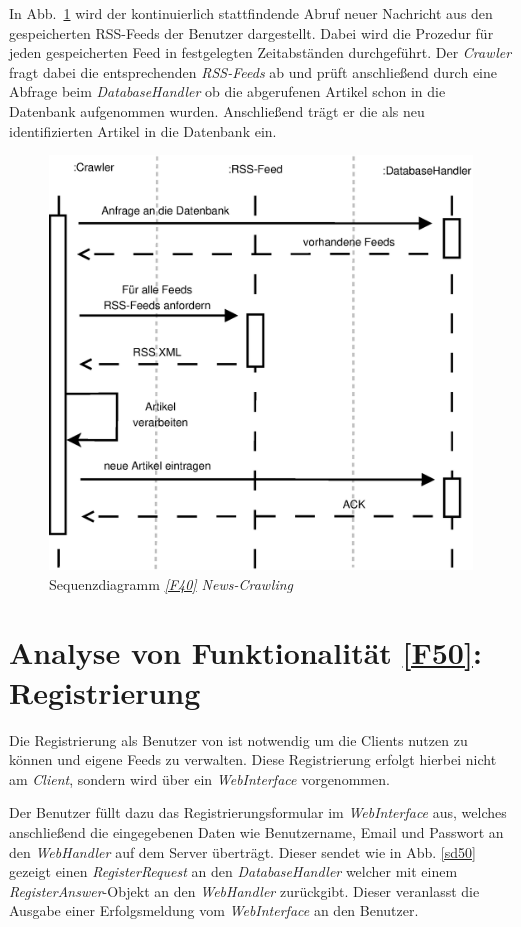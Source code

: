 In Abb.~\ref{sd40} wird der kontinuierlich stattfindende Abruf neuer Nachricht
aus den gespeicherten RSS-Feeds der Benutzer dargestellt. Dabei wird die
Prozedur für jeden gespeicherten Feed in festgelegten Zeitabständen
durchgeführt. Der \textit{Crawler} fragt dabei die entsprechenden
\textit{RSS-Feeds} ab und prüft anschließend durch eine Abfrage beim
\textit{DatabaseHandler} ob die abgerufenen Artikel schon in die Datenbank
aufgenommen wurden. Anschließend trägt er die als neu identifizierten Artikel in
die Datenbank ein.

\begin{figure}[h]
\centering
\includegraphics[width=.7\textwidth]{Systementwurf/02_produktfunktionsanalyse/f400}
\caption{Sequenzdiagramm \textit{\ref{F40} News-Crawling}
\label{sd40}}
\end{figure}

\FloatBarrier

\section{Analyse von Funktionalität \ref{F50}: Registrierung}

Die Registrierung als Benutzer von \NewsGenie ist notwendig um die Clients
nutzen zu können und eigene Feeds zu verwalten. Diese Registrierung erfolgt
hierbei nicht am \textit{Client}, sondern wird über ein \textit{WebInterface}
vorgenommen.

Der Benutzer füllt dazu das Registrierungsformular im \textit{WebInterface} aus,
welches anschließend die eingegebenen Daten wie Benutzername, Email und Passwort
an den \textit{WebHandler} auf dem Server überträgt. Dieser sendet wie in Abb.
\ref{sd50} gezeigt einen \textit{RegisterRequest} an den
\textit{DatabaseHandler} welcher mit einem \textit{RegisterAnswer}-Objekt an den 
\textit{WebHandler} zurückgibt. Dieser veranlasst die Ausgabe einer
Erfolgsmeldung vom \textit{WebInterface} an den Benutzer.

